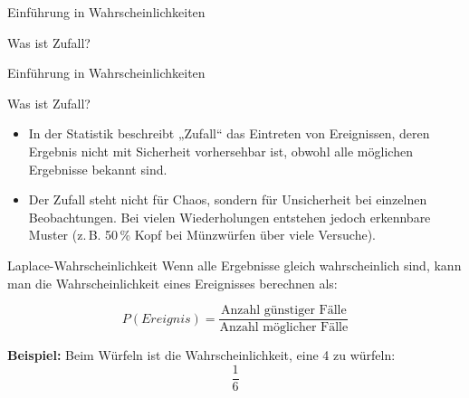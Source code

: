 \documentclass[
  ignorenonframetext,
]{beamer}
\begin{document}
\begin{frame}{Einführung in Wahrscheinlichkeiten}
\protect{}\label{einfuxfchrung-in-wahrscheinlichkeiten}
\begin{block}{Was ist Zufall?}
\protect{}\label{was-ist-zufall}
\end{block}
\end{frame}

\begin{frame}{Einführung in Wahrscheinlichkeiten}
\protect{}\label{einfuxfchrung-in-wahrscheinlichkeiten-1}
\begin{block}{Was ist Zufall?}
\protect{}\label{was-ist-zufall-1}
\begin{itemize}
\item
  In der Statistik beschreibt „Zufall`` das Eintreten von Ereignissen,
  deren Ergebnis nicht mit Sicherheit vorhersehbar ist, obwohl alle
  möglichen Ergebnisse bekannt sind.
\item
  Der Zufall steht nicht für Chaos, sondern für Unsicherheit bei
  einzelnen Beobachtungen. Bei vielen Wiederholungen entstehen jedoch
  erkennbare Muster (z.\,B. 50\,\% Kopf bei Münzwürfen über viele
  Versuche).
\end{itemize}
\end{block}
\end{frame}

\begin{frame}{Laplace-Wahrscheinlichkeit}
\protect{}\label{laplace-wahrscheinlichkeit}
Wenn alle Ergebnisse gleich wahrscheinlich sind, kann man die
Wahrscheinlichkeit eines Ereignisses berechnen als:

\[P(Ereignis) = \frac{\text{Anzahl günstiger Fälle}}{\text{Anzahl möglicher Fälle}}\]

\textbf{Beispiel:} Beim Würfeln ist die Wahrscheinlichkeit, eine 4 zu
würfeln: \[\frac{1}{6}\]
\end{frame}
\end{document}
